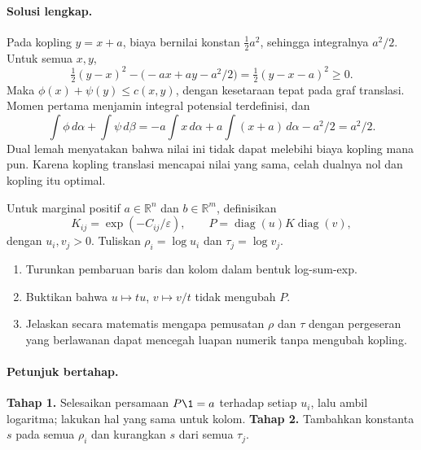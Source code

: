 \paragraph{Solusi lengkap.}
\label{orig03:ps06:solution:0002}
Pada kopling $y=x+a$, biaya bernilai konstan
$\tfrac12a^2$, sehingga integralnya $a^2/2$. Untuk semua $x,y$,
\[
 \tfrac12(y-x)^2-\bigl(-ax+ay-a^2/2\bigr)
 =\tfrac12(y-x-a)^2\ge0.
\]
Maka $\phi(x)+\psi(y)\le c(x,y)$, dengan kesetaraan tepat pada graf translasi.
Momen pertama menjamin integral potensial terdefinisi, dan
\[
 \int\phi\,d\alpha+\int\psi\,d\beta
 =-a\int x\,d\alpha
  +a\int(x+a)\,d\alpha-a^2/2
 =a^2/2.
\]
Dual lemah menyatakan bahwa nilai ini tidak dapat melebihi biaya kopling mana
pun. Karena kopling translasi mencapai nilai yang sama, celah dualnya nol dan
kopling itu optimal.

\begin{exercise}
\label{orig03:ps06:exercise:0003}
Untuk marginal positif $a\in\mathbb R^n$ dan $b\in\mathbb R^m$, definisikan
\[
 K_{ij}=\exp(-C_{ij}/\varepsilon),
 \qquad P=\operatorname{diag}(u)K\operatorname{diag}(v),
 \]
dengan $u_i,v_j>0$. Tuliskan $\rho_i=\log u_i$ dan $\tau_j=\log v_j$.

\begin{enumerate}
  \item Turunkan pembaruan baris dan kolom dalam bentuk log-sum-exp.
  \item Buktikan bahwa $u\mapsto tu$, $v\mapsto v/t$ tidak mengubah $P$.
  \item Jelaskan secara matematis mengapa pemusatan $\rho$ dan $\tau$ dengan
  pergeseran yang berlawanan dapat mencegah luapan numerik tanpa mengubah
  kopling.
\end{enumerate}
\end{exercise}

\paragraph{Petunjuk bertahap.}
\label{orig03:ps06:hint:0003}
\textbf{Tahap 1.} Selesaikan persamaan $P\1=a$ terhadap setiap $u_i$,
lalu ambil logaritma; lakukan hal yang sama untuk kolom.
\textbf{Tahap 2.} Tambahkan konstanta $s$ pada semua $\rho_i$ dan kurangkan
$s$ dari semua $\tau_j$.

